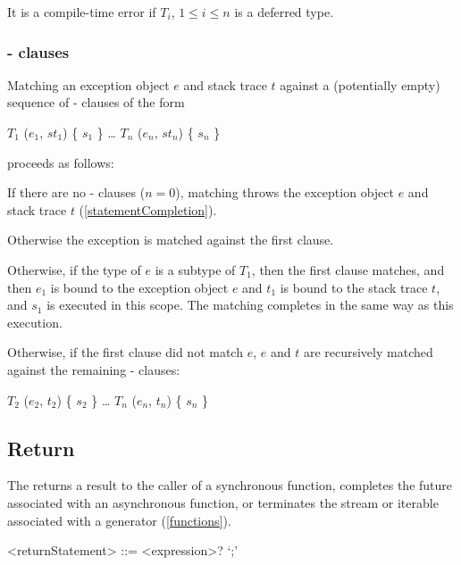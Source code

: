 \documentclass[makeidx]{article}
\begin{document}
{\LMHash{}%
It is a compile-time error if $T_i$, $1 \le i \le n$ is a deferred type.


\subsubsection{\ON{}-\CATCH{} clauses}

\LMHash{}%
Matching an exception object $e$ and stack trace $t$ against
a (potentially empty) sequence of \ON{}-\CATCH{} clauses of the form

\begin{normativeDartCode}
\ON{} $T_1$ \CATCH{} ($e_1$, $st_1$) \{ $s_1$ \}
\ldots
\ON{} $T_n$ \CATCH{} ($e_n$, $st_n$) \{ $s_n$ \}
\end{normativeDartCode}
proceeds as follows:

\LMHash{}%
If there are no \ON{}-\CATCH{} clauses ($n = 0$), matching throws
the exception object $e$ and stack trace $t$
(\ref{statementCompletion}).

\LMHash{}%
Otherwise the exception is matched against the first clause.

\LMHash{}%
Otherwise, if the type of $e$ is a subtype of $T_1$,
then the first clause matches,
and then $e_1$ is bound to the exception object $e$
and $t_1$ is bound to the stack trace $t$,
and $s_1$ is executed in this scope.
The matching completes in the same way as this execution.

\LMHash{}%
Otherwise, if the first clause did not match $e$,
$e$ and $t$ are recursively matched against
the remaining \ON{}-\CATCH{} clauses:

\begin{normativeDartCode}
\ON{} $T_2$ \CATCH{} ($e_2$, $t_2$) \{ $s_2$ \}
\ldots
\ON{} $T_n$ \CATCH{} ($e_n$, $t_n$) \{ $s_n$ \}
\end{normativeDartCode}


\subsection{Return}

\LMHash{}%
The 
returns a result to the caller of a synchronous function,
completes the future associated with an asynchronous function,
or terminates the stream or iterable associated with a generator
(\ref{functions}).

\begin{grammar}
<returnStatement> ::= \RETURN{} <expression>? `;'
\end{grammar}

}
\end{document}
